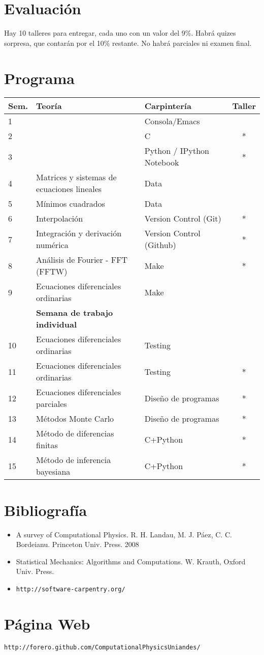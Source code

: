 \documentclass[12pt]{article}
\begin{document}
\section*{Evaluaci\'on}
Hay 10 talleres para entregar, cada uno con un valor del 9\%. Habr\'a  quizes sorpresa, que contar\'an por el 10\% restante. No habr\'a parciales ni examen final.

 
\section*{Programa}

\begin{center}
\begin{tabular}{|l|l|l|c|}
\hline
Sem. & Teor\'ia & Carpinter\'ia & Taller \\\hline
1 & 	&Consola/Emacs &\\
2 & 	&C  &*\\
3 & 	&Python / IPython Notebook &*\\
4 & Matrices y sistemas de ecuaciones lineales & Data &\\
5 & M\'inimos cuadrados & Data &\\
6 & Interpolaci\'on & Version Control (Git) &*\\
7 & Integraci\'on y derivaci\'on num\'erica & Version Control (Github)& *\\
8 & An\'alisis de Fourier - FFT  (FFTW)& Make& *\\
9 & Ecuaciones diferenciales ordinarias & Make&\\
 & {\bf Semana de trabajo individual} & &\\
10 & Ecuaciones diferenciales ordinarias & Testing&\\
11 & Ecuaciones diferenciales ordinarias & Testing &*\\
12 & Ecuaciones diferenciales parciales & Dise\~no de programas&*\\
13 & M\'etodos Monte Carlo & Dise\~no de programas &*\\
14 & M\'etodo de diferencias finitas & C+Python &*\\
15 & M\'etodo de inferencia bayesiana& C+Python &*\\
\hline
\end{tabular}
\end{center}


\section*{Bibliograf\'ia}
\begin{itemize}
\item
A survey of Computational Physics. R. H. Landau, M. J. P\'aez, C. C.
Bordeianu. Princeton Univ. Press. 2008 
\item
Statistical Mechanics: Algorithms and Computations. W. Krauth, Oxford Univ. Press. 
\item\verb"http://software-carpentry.org/"
\end{itemize}

\section*{P\'agina Web}
\begin{verbatim}
http://forero.github.com/ComputationalPhysicsUniandes/
\end{verbatim}

 
\end{document}
